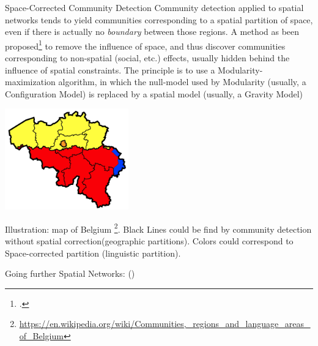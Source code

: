 \documentclass[a4paper,11pt]{book}
\begin{document}
\begin{textbox}{Space-Corrected Community Detection}
Community detection applied to spatial networks tends to yield communities corresponding to a spatial partition of space, even if there is actually no \textit{boundary} between those regions. A method as been proposed\footcite{expert2011uncovering} to remove the influence of space, and thus discover communities corresponding to non-spatial (social, etc.) effects, usually hidden behind the influence of spatial constraints. The principle is to use a Modularity-maximization algorithm, in which the null-model used by Modularity (usually, a Configuration Model) is replaced by a spatial model (usually, a Gravity Model)

\centering
\includegraphics[width=0.4\textwidth]{pics/belgium.png}

Illustration: map of Belgium \footnote{\url{https://en.wikipedia.org/wiki/Communities,_regions_and_language_areas_of_Belgium}}. Black Lines could be find by community detection without spatial correction(geographic partitions). Colors could correspond to Space-corrected partition (linguistic partition).
\end{textbox}






\begin{textbox}{Going further}
Spatial Networks: (\cite{barthelemy2011spatial})
\end{textbox}


\end{document}

